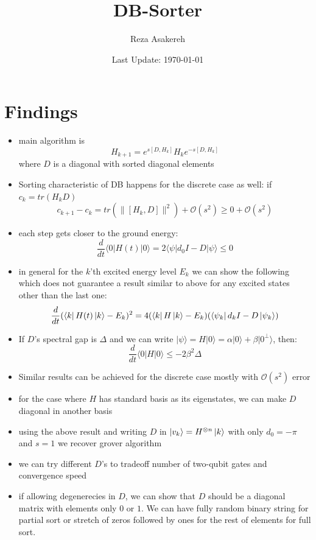 \documentclass[11pt]{article}
\title{DB-Sorter}
\author{Reza Asakereh}
\date{Last Update: \today}
\begin{document}
\maketitle

\section{Findings}
\begin{itemize}
    \item main algorithm is $$H_{k+1} = e^{s[D, H_k]} H_k e^{-s[D, H_k]}$$ where $D$ is a diagonal with sorted diagonal elements
    \item Sorting characteristic of DB happens for the discrete case as well: if $c_k = tr(H_kD)$
    $$ c_{k+1} - c_k = tr(\lVert[H_k, D]\rVert^2) + \mathcal{O}(s^2) \geq 0 + \mathcal{O}(s^2) $$
    \item each step gets closer to the ground energy: $$ \frac{d}{dt}{\langle 0|H(t)|0\rangle} = 2\langle \psi|d_0I - D|\psi\rangle \leq 0 $$
    \item in general for the $k$'th excited energy level $E_k$ we can show the following which does not guarantee a result similar to above for any excited states other than the last one:
    $$\frac{d}{dt}(\bra{k} H(t) \ket{k} - E_k)^2 = 4(\bra{k} H \ket{k} - E_k)(\bra{\psi_k} d_kI - D \ket{\psi_k})$$
    \item If $D$'s spectral gap is $\Delta$ and we can write $|\psi \rangle = H|0\rangle = \alpha |0\rangle + \beta|0^\perp \rangle$, then:
    $$ \frac{d}{dt}{\langle 0|H|0\rangle} \leq -2\beta^2\Delta $$
    \item Similar results can be achieved for the discrete case mostly with $\mathcal{O}(s^2)$ error
    \item for the case where $H$ has standard basis as its eigenstates, we can make $D$ diagonal in another basis
    \item using the above result and writing $D$ in $\ket{v_k} = H^{\otimes n}\ket{k}$ with only $d_0 = -\pi$ and $s=1$ we recover grover algorithm
    \item we can try different $D$'s to tradeoff number of two-qubit gates and convergence speed
    \item if allowing degenerecies in $D$, we can show that $D$ should be a diagonal matrix with elements only $0$ or $1$. We can have fully random binary string for partial sort or stretch of zeros followed by ones for the rest of elements for full sort. 
\end{itemize}
\end{document}
